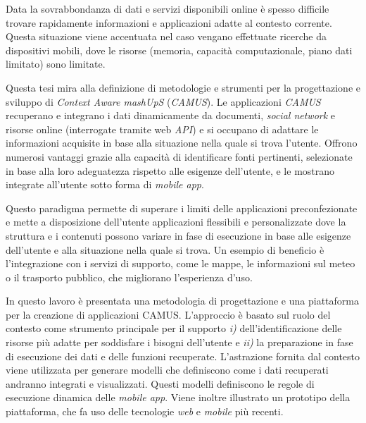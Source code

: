 Data la sovrabbondanza di dati e servizi disponibili online è spesso difficile trovare rapidamente informazioni e applicazioni adatte al contesto corrente. Questa situazione viene accentuata nel caso vengano effettuate ricerche da dispositivi mobili, dove le risorse (memoria, capacità computazionale, piano dati limitato) sono limitate.

Questa tesi mira alla definizione di metodologie e strumenti per la progettazione e sviluppo di \emph{Context Aware mashUpS} (\emph{CAMUS}). Le applicazioni \emph{CAMUS} recuperano e integrano i dati dinamicamente da documenti, \emph{social network} e risorse online (interrogate tramite web \emph{API}) e si occupano di adattare le informazioni acquisite in base alla situazione nella quale si trova l'utente. Offrono numerosi vantaggi grazie alla capacità di identificare fonti pertinenti, selezionate in base alla loro adeguatezza rispetto alle esigenze dell'utente, e le mostrano integrate all'utente sotto forma di \emph{mobile app}.

Questo paradigma permette di superare i limiti delle applicazioni preconfezionate e mette a disposizione dell'utente applicazioni flessibili e personalizzate dove la struttura e i contenuti possono variare in fase di esecuzione in base alle esigenze dell'utente e alla situazione nella quale si trova. Un esempio di beneficio è l'integrazione con i servizi di supporto, come le mappe, le informazioni sul meteo o il trasporto pubblico, che migliorano l'esperienza d'uso.

In questo lavoro è presentata una metodologia di progettazione e una piattaforma per la creazione di applicazioni CAMUS. L'approccio è basato sul ruolo del contesto come strumento principale per il supporto \emph{i)} dell'identificazione delle risorse più adatte per soddisfare i bisogni dell'utente e \emph{ii)} la preparazione in fase di esecuzione dei dati e delle funzioni recuperate. L'astrazione fornita dal contesto viene utilizzata per generare modelli che definiscono come i dati recuperati andranno integrati e visualizzati. Questi modelli definiscono le regole di esecuzione dinamica delle \emph{mobile app}. Viene inoltre illustrato un prototipo della piattaforma, che fa uso delle tecnologie \emph{web} e \emph{mobile} più recenti.